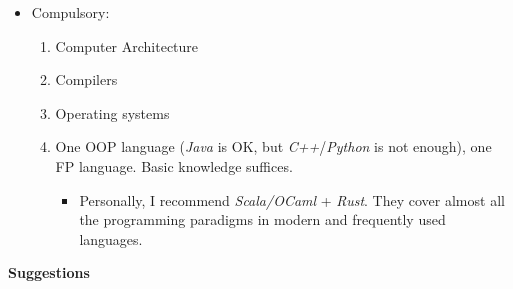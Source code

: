\documentclass{article}
\begin{document}
\begin{itemize}
    \begin{itemize}
        \item Compulsory:
        \begin{enumerate}
            \item Computer Architecture
            \item Compilers
            \item Operating systems
            \item One OOP language  (\emph{Java} is OK, but \emph{C++}/\emph{Python} is not enough), one FP language.
            Basic knowledge suffices.
            \begin{itemize}
                \item Personally, I recommend \emph{Scala/OCaml} + \emph{Rust}.
                They cover almost all the programming paradigms in modern and frequently used languages.
            \end{itemize}
        \end{enumerate}
    \end{itemize}    
\end{itemize}
    \textbf{Suggestions}
\end{document}
